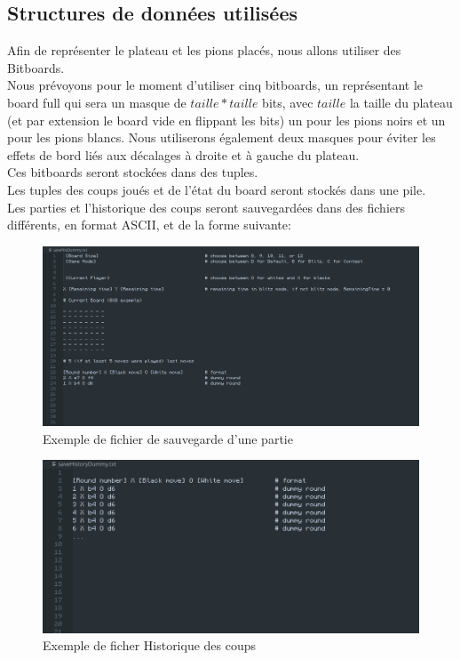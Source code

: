 \documentclass[a4paper,12pt]{article}
\begin{document}
\subsection{Structures de données utilisées}
Afin de représenter le plateau et les pions placés, nous allons utiliser des
Bitboards.\\ Nous prévoyons pour le moment d'utiliser cinq bitboards, un
représentant le board full qui sera un masque de $taille*taille$ bits, avec
$taille$ la taille du plateau (et par extension le board vide en flippant les
bits) un pour les pions noirs et un pour les pions blancs. Nous utiliserons
également deux masques pour éviter les effets de bord liés aux décalages à
droite et à gauche du plateau.\\ Ces bitboards seront stockées dans des
tuples.\\ Les tuples des coups joués et de l'état du board seront stockés dans
une pile.\\ Les parties et l'historique des coups seront sauvegardées dans des
fichiers différents, en format ASCII, et de la forme suivante:\\
\begin{figure}[H]
  \centering
  \includegraphics[width=1\linewidth]{images/SaveFileGame.png}
  \caption{Exemple de fichier de sauvegarde d'une partie}
  \label{fig:enter-label}
\end{figure}
\begin{figure}[H]
  \centering
  \includegraphics[width=1\linewidth]{images/SaveFileHistory.png}
  \caption{Exemple de ficher Historique des coups}
  \label{fig:enter-label}
\end{figure}
\end{document}
